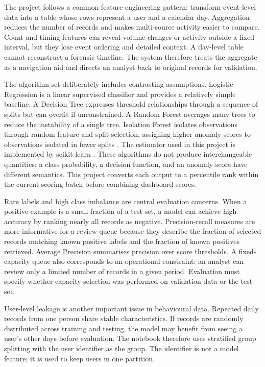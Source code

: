 \documentclass[12pt,a4paper,oneside]{report}
\begin{document}
The project follows a common feature-engineering pattern: transform
event-level data into a table whose rows represent a user and a
calendar day. Aggregation reduces the number of records and makes
multi-source activity easier to compare. Count and timing features can
reveal volume changes or activity outside a fixed interval, but they
lose event ordering and detailed context. A day-level table cannot
reconstruct a forensic timeline. The system therefore treats the
aggregate as a navigation aid and directs an analyst back to original
records for validation.

The algorithm set deliberately includes contrasting assumptions.
Logistic Regression is a linear supervised classifier and provides a
relatively simple baseline. A Decision Tree expresses threshold
relationships through a sequence of splits but can overfit if
unconstrained. A Random Forest averages many trees to reduce the
instability of a single tree. Isolation Forest isolates observations
through random feature and split selection, assigning higher anomaly
scores to observations isolated in fewer splits
\cite{liu2008isolation}. The estimator used in this project is
implemented by scikit-learn \cite{sklearn}. These algorithms do not
produce interchangeable quantities: a class probability, a decision
function, and an anomaly score have different semantics. This project
converts each output to a percentile rank within the current scoring
batch before combining dashboard scores.

Rare labels and high class imbalance are central evaluation concerns.
When a positive example is a small fraction of a test set, a model can
achieve high accuracy by ranking nearly all records as negative.
Precision-recall measures are more informative for a review queue
because they describe the fraction of selected records matching known
positive labels and the fraction of known positives retrieved. Average
Precision summarises precision over score thresholds. A fixed-capacity
queue also corresponds to an operational constraint: an analyst can
review only a limited number of records in a given period. Evaluation
must specify whether capacity selection was performed on validation
data or the test set.

User-level leakage is another important issue in behavioural data.
Repeated daily records from one person share stable characteristics.
If records are randomly distributed across training and testing, the
model may benefit from seeing a user's other days before evaluation.
The notebook therefore uses stratified group splitting with the user
identifier as the group. The identifier is not a model feature; it is
used to keep users in one partition.
\end{document}

